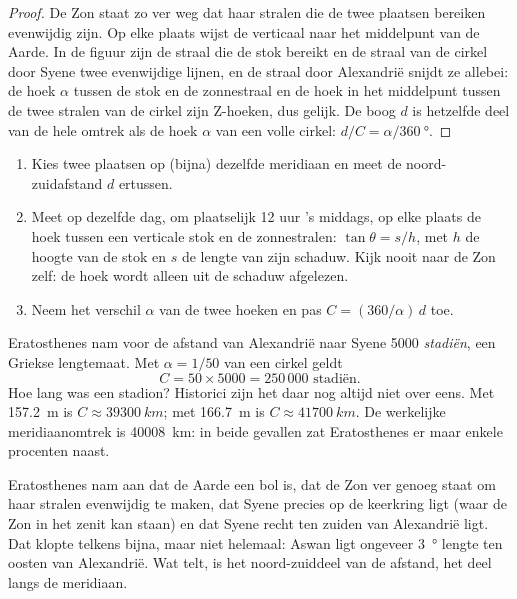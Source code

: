 \begin{proof}
De Zon staat zo ver weg dat haar stralen die de twee plaatsen bereiken
evenwijdig zijn. Op elke plaats wijst de verticaal naar het middelpunt van de
Aarde. In de figuur zijn de straal die de stok bereikt en de straal van de cirkel
door Syene twee evenwijdige lijnen, en de straal door Alexandrië snijdt ze
allebei: de hoek $\alpha$ tussen de stok en de zonnestraal en de hoek in het
middelpunt tussen de twee stralen van de cirkel zijn Z-hoeken, dus gelijk. De
boog $d$ is hetzelfde deel van de hele omtrek als de hoek $\alpha$ van een volle
cirkel: $d/C = \alpha/\qty{360}{\degree}$.
\end{proof}

\begin{method}\label{met:g10:measuring-the-earth:shadows}
\begin{enumerate}
  \item Kies twee plaatsen op (bijna) dezelfde meridiaan en meet de
        noord-zuidafstand $d$ ertussen.
  \item Meet op dezelfde dag, om plaatselijk 12 uur 's middags, op elke plaats
        de hoek tussen een verticale stok en de zonnestralen: $\tan \theta = s/h$,
        met $h$ de hoogte van de stok en $s$ de lengte van zijn schaduw. Kijk
        nooit naar de Zon zelf: de hoek wordt alleen uit de schaduw afgelezen.
  \item Neem het verschil $\alpha$ van de twee hoeken en pas
        $C = (360/\alpha)\,d$ toe.
\end{enumerate}
\end{method}

\begin{example}\label{ex:g10:measuring-the-earth:numbers}
Eratosthenes nam voor de afstand van Alexandrië naar Syene 5000
\emph{stadiën}, een Griekse lengtemaat. Met $\alpha = 1/50$ van een cirkel geldt
\[
  C = 50 \times 5000 = 250\,000 \text{ stadiën}.
\]
Hoe lang was een stadion? Historici zijn het daar nog altijd niet over eens.
Met \qty{157.2}{m} is $C \approx \qty{39300}{km}$; met \qty{166.7}{m} is
$C \approx \qty{41700}{km}$. De werkelijke meridiaanomtrek is
\qty{40008}{km}: in beide gevallen zat Eratosthenes er maar enkele procenten naast.
\end{example}

\begin{remark}\label{rem:g10:measuring-the-earth:assumptions}
Eratosthenes nam aan dat de Aarde een bol is, dat de Zon ver genoeg staat om
haar stralen evenwijdig te maken, dat Syene precies op de keerkring ligt (waar
de Zon in het zenit kan staan) en dat Syene recht ten zuiden van Alexandrië
ligt. Dat klopte telkens bijna, maar niet helemaal: Aswan ligt ongeveer
\qty{3}{\degree} lengte ten oosten van Alexandrië. Wat telt, is het
noord-zuiddeel van de afstand, het deel langs de meridiaan.
\end{remark}

